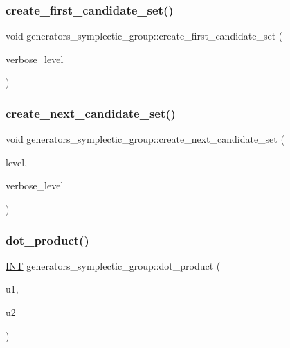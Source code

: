 \subsubsection{\texorpdfstring{create\+\_\+first\+\_\+candidate\+\_\+set()}{create\_first\_candidate\_set()}}
{\footnotesize\ttfamily void generators\+\_\+symplectic\+\_\+group\+::create\+\_\+first\+\_\+candidate\+\_\+set (\begin{DoxyParamCaption}\item[{\mbox{\hyperlink{galois_8h_a09fddde158a3a20bd2dcadb609de11dc}{I\+NT}}}]{verbose\+\_\+level }\end{DoxyParamCaption})}

\mbox{\label{classgenerators__symplectic__group_a4f120fe4d0c6e692ada67076312d5f21}} 
\subsubsection{\texorpdfstring{create\+\_\+next\+\_\+candidate\+\_\+set()}{create\_next\_candidate\_set()}}
{\footnotesize\ttfamily void generators\+\_\+symplectic\+\_\+group\+::create\+\_\+next\+\_\+candidate\+\_\+set (\begin{DoxyParamCaption}\item[{\mbox{\hyperlink{galois_8h_a09fddde158a3a20bd2dcadb609de11dc}{I\+NT}}}]{level,  }\item[{\mbox{\hyperlink{galois_8h_a09fddde158a3a20bd2dcadb609de11dc}{I\+NT}}}]{verbose\+\_\+level }\end{DoxyParamCaption})}

\mbox{\label{classgenerators__symplectic__group_afcbcf5c147d2a3d7041358befe08db1d}} 
\subsubsection{\texorpdfstring{dot\+\_\+product()}{dot\_product()}}
{\footnotesize\ttfamily \mbox{\hyperlink{galois_8h_a09fddde158a3a20bd2dcadb609de11dc}{I\+NT}} generators\+\_\+symplectic\+\_\+group\+::dot\+\_\+product (\begin{DoxyParamCaption}\item[{\mbox{\hyperlink{galois_8h_a09fddde158a3a20bd2dcadb609de11dc}{I\+NT}} $\ast$}]{u1,  }\item[{\mbox{\hyperlink{galois_8h_a09fddde158a3a20bd2dcadb609de11dc}{I\+NT}} $\ast$}]{u2 }\end{DoxyParamCaption})}

